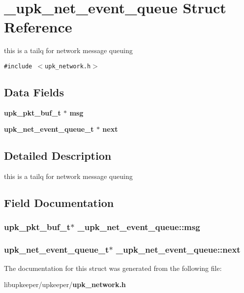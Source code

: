 \section{\_\-upk\_\-net\_\-event\_\-queue Struct Reference}
\label{struct__upk__net__event__queue}
this is a tailq for network message queuing  


{\tt \#include $<$upk\_\-network.h$>$}

\subsection*{Data Fields}
\begin{CompactItemize}
\item 
\bf{upk\_\-pkt\_\-buf\_\-t} $\ast$ \bf{msg}
\item 
\bf{upk\_\-net\_\-event\_\-queue\_\-t} $\ast$ \bf{next}
\end{CompactItemize}


\subsection{Detailed Description}
this is a tailq for network message queuing 



\subsection{Field Documentation}
\subsubsection{\setlength{\rightskip}{0pt plus 5cm}\bf{upk\_\-pkt\_\-buf\_\-t}$\ast$ \bf{\_\-upk\_\-net\_\-event\_\-queue::msg}}\label{struct__upk__net__event__queue_d834fe7ecb915b376df848f0185bc967}


\subsubsection{\setlength{\rightskip}{0pt plus 5cm}\bf{upk\_\-net\_\-event\_\-queue\_\-t}$\ast$ \bf{\_\-upk\_\-net\_\-event\_\-queue::next}}\label{struct__upk__net__event__queue_0033fc9d93fd1af1a0a916cac2621246}




The documentation for this struct was generated from the following file:\begin{CompactItemize}
\item 
libupkeeper/upkeeper/\bf{upk\_\-network.h}\end{CompactItemize}
